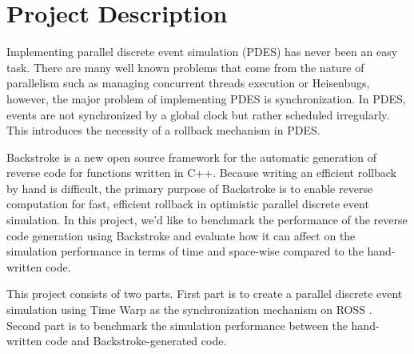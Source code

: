 \section{Project Description}

Implementing parallel discrete event simulation (PDES) \cite{fujpar} has never been an easy task. There
are many well known problems that come from the nature of parallelism such as managing
concurrent threads execution or Heisenbugs, however, the major problem of implementing
PDES is synchronization. In PDES, events are not synchronized by a global clock but rather
scheduled irregularly. This introduces the necessity of a rollback mechanism in PDES.

Backstroke \cite{vulthe} is a new open source framework for the automatic generation of reverse code for
functions written in C++. Because writing an efficient rollback by hand is difficult, the primary
purpose of Backstroke is to enable reverse computation for fast, efficient rollback in optimistic
parallel discrete event simulation.  In this project, we’d like to benchmark the performance of the reverse code generation using
Backstroke and evaluate how it can affect on the simulation performance in terms of time and
space-wise compared to the hand-written code.

This project consists of two parts. First part is to create a parallel discrete event simulation using
Time Warp as the synchronization mechanism on ROSS \cite{carros}. Second part is to benchmark the
simulation performance between the hand-written code and Backstroke-generated code.
